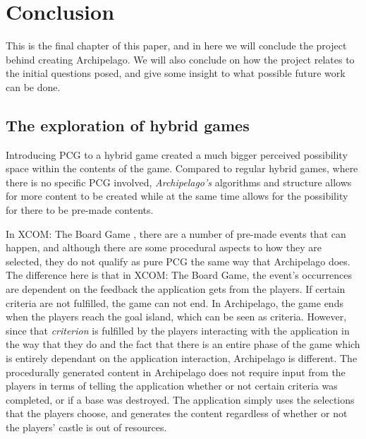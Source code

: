 \chapter{Conclusion}
This is the final chapter of this paper, and in here we will conclude the project behind creating Archipelago. We will also conclude on how the project relates to the initial questions posed, and give some insight to what possible future work can be done.


\section{The exploration of hybrid games}
Introducing PCG to a hybrid game created a much bigger perceived possibility space within the contents of the game. Compared to regular hybrid games, where there is no specific PCG involved, \textit{Archipelago's} algorithms and structure allows for more content to be created while at the same time allows for the possibility for there to be pre-made contents. 

In XCOM: The Board Game \cite{game:xcomtbg}, there are a number of pre-made events that can happen, and although there are some procedural aspects to how they are selected, they do not qualify as pure PCG the same way that Archipelago does. The difference here is that in XCOM: The Board Game, the event's occurrences are dependent on the feedback the application gets from the players. If certain criteria are not fulfilled, the game can not end. In Archipelago, the game ends when the players reach the goal island, which can be seen as criteria. However, since that \textit{criterion} is fulfilled by the players interacting with the application in the way that they do and the fact that there is an entire phase of the game which is entirely dependant on the application interaction, Archipelago is different. The procedurally generated content in Archipelago does not require input from the players in terms of telling the application whether or not certain criteria was completed, or if a base was destroyed. The application simply uses the selections that the players choose, and generates the content regardless of whether or not the players' castle is out of resources.

